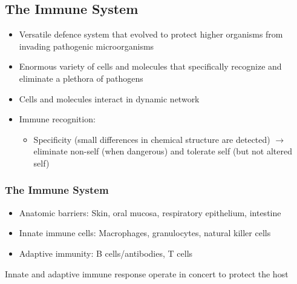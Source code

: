 \begin{itemize}
\begin{itemize}
\subsection{The Immune System}
\begin{itemize}
    \item Versatile defence system that evolved to protect higher organisms from invading pathogenic microorganisms
    \item Enormous variety of cells and molecules that specifically recognize and eliminate a plethora of pathogens
    \item Cells and molecules interact in dynamic network
    \item Immune recognition:
    \begin{itemize}
        \item Specificity (small differences in chemical structure are detected) $\rightarrow$ eliminate non-self (when dangerous) and tolerate self (but not altered self)
    \end{itemize}
\end{itemize}
\subsubsection{The Immune System}
\begin{itemize}
    \item Anatomic barriers: Skin, oral mucosa, respiratory epithelium, intestine
    \item Innate immune cells: Macrophages, granulocytes, natural killer cells
    \item Adaptive immunity: B cells/antibodies, T cells
\end{itemize}
Innate and adaptive immune response operate in concert to protect the host


\end{itemize}
\end{itemize}
